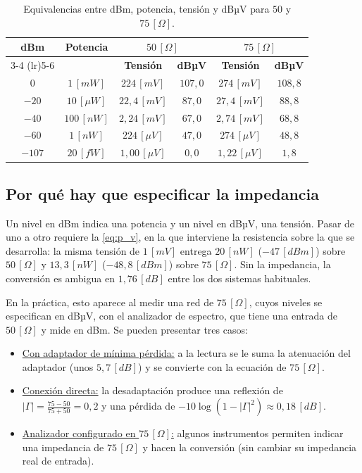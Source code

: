 \begin{table}[H]
    \centering
    \caption{Equivalencias entre dBm, potencia, tensión y dBµV para $50$ y $75 \, [\Omega]$.}
    \label{tab:conversion}
    \begin{tabular}{c c c c c c}
        \toprule
        \multirow{2}{*}{\textbf{dBm}} & \multirow{2}{*}{\textbf{Potencia}} & \multicolumn{2}{c}{\textbf{$50 \, [\Omega]$}} & \multicolumn{2}{c}{\textbf{$75 \, [\Omega]$}} \\
        \cmidrule(lr){3-4} \cmidrule(lr){5-6}
        & & \textbf{Tensión} & \textbf{dBµV} & \textbf{Tensión} & \textbf{dBµV} \\
        \midrule
        $0$   & $1 \, [mW]$   & $224 \, [mV]$  & $107{,}0$ & $274 \, [mV]$  & $108{,}8$ \\
        $-20$ & $10 \, [\mu W]$ & $22{,}4 \, [mV]$ & $87{,}0$ & $27{,}4 \, [mV]$ & $88{,}8$ \\
        $-40$ & $100 \, [nW]$ & $2{,}24 \, [mV]$ & $67{,}0$ & $2{,}74 \, [mV]$ & $68{,}8$ \\
        $-60$ & $1 \, [nW]$   & $224 \, [\mu V]$ & $47{,}0$ & $274 \, [\mu V]$ & $48{,}8$ \\
        $-107$ & $20 \, [fW]$ & $1{,}00 \, [\mu V]$ & $0{,}0$ & $1{,}22 \, [\mu V]$ & $1{,}8$ \\
        \bottomrule
    \end{tabular}
\end{table}

\subsection{Por qué hay que especificar la impedancia}
Un nivel en dBm indica una potencia y un nivel en dBµV, una tensión. Pasar de uno a otro requiere la \autoref{eq:p_v}, en la que interviene la resistencia sobre la que se desarrolla: la misma tensión de $1 \, [mV]$ entrega $20 \, [nW]$ ($-47 \, [dBm]$) sobre $50 \, [\Omega]$ y $13{,}3 \, [nW]$ ($-48{,}8 \, [dBm]$) sobre $75 \, [\Omega]$. Sin la impedancia, la conversión es ambigua en $1{,}76 \, [dB]$ entre los dos sistemas habituales.

En la práctica, esto aparece al medir una red de $75 \, [\Omega]$, cuyos niveles se especifican en dBµV, con el analizador de espectro, que tiene una entrada de $50 \, [\Omega]$ y mide en dBm. Se pueden presentar tres casos:
\begin{itemize}
    \item \underline{Con adaptador de mínima pérdida:} a la lectura se le suma la atenuación del adaptador (unos $5{,}7 \, [dB]$) y se convierte con la ecuación de $75 \, [\Omega]$.
    \item \underline{Conexión directa:} la desadaptación produce una reflexión de $|\Gamma| = \frac{75 - 50}{75 + 50} = 0{,}2$ y una pérdida de $-10 \log\left(1 - |\Gamma|^2\right) \approx 0{,}18 \, [dB]$.
    \item \underline{Analizador configurado en $75 \, [\Omega]$:} algunos instrumentos permiten indicar una impedancia de $75 \, [\Omega]$ y hacen la conversión (sin cambiar su impedancia real de entrada).
\end{itemize}

